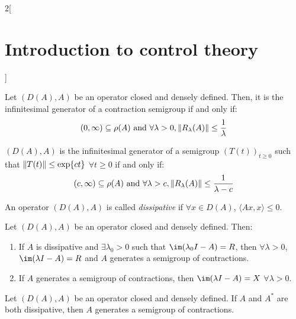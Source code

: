 \documentclass[../../../main_math.tex]{subfiles}
\begin{document}
\begin{multicols}{2}[\section{Introduction to control theory}]
\begin{definition}
  \end{definition}
  \begin{theorem}
    Let $(D(A),A)$ be an operator closed and densely defined. Then, it is the infinitesimal generator of a contraction semigroup if and only if:
    $$
      (0,\infty)\subseteq \rho(A)\text{ and }\forall \lambda>0, \norm{R_\lambda(A)}\leq \frac{1}{\lambda}
    $$
  \end{theorem}
  \begin{corollary}
    $(D(A),A)$ is the infinitesimal generator of a semigroup $(T(t))_{t\geq 0}$ such that $\norm{T(t)}\leq \exp{ct}$ $\forall t\geq 0$ if and only if:
    $$
      (c,\infty)\subseteq \rho(A)\text{ and }\forall \lambda>c, \norm{R_\lambda(A)}\leq \frac{1}{\lambda-c}
    $$
  \end{corollary}
  \begin{definition}
    An operator $(D(A),A)$ is called \emph{dissipative} if $\forall x\in D(A)$, $\langle Ax,x\rangle\leq 0$.
  \end{definition}
  \begin{theorem}
    Let $(D(A),A)$ be an operator closed and densely defined. Then:
    \begin{enumerate}
      \item If $A$ is dissipative and $\exists \lambda_0>0$ such that $\im(\lambda_0 I-A)=R$, then $\forall \lambda>0$, $\im(\lambda I-A)=R$ and $A$ generates a semigroup of contractions.
      \item If $A$ generates a semigroup of contractions, then $\im(\lambda I-A)=X$ $\forall \lambda>0$.
    \end{enumerate}
  \end{theorem}
  \begin{corollary}
    Let $(D(A),A)$ be an operator closed and densely defined. If $A$ and $A^*$ are both dissipative, then $A$ generates a semigroup of contractions.
  \end{corollary}

\end{multicols}
\end{document}

